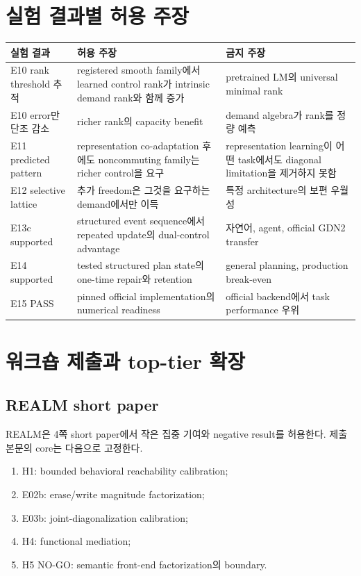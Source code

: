 \documentclass[10.3pt,a4paper]{article}
\begin{document}
\section{실험 결과별 허용 주장}
\begin{longtable}{p{32mm}p{55mm}p{58mm}}
\toprule
실험 결과 & 허용 주장 & 금지 주장 \\
\midrule
E10 rank threshold 추적 & registered smooth family에서 learned control rank가 intrinsic demand rank와 함께 증가 & pretrained LM의 universal minimal rank \\
E10 error만 단조 감소 & richer rank의 capacity benefit & demand algebra가 rank를 정량 예측 \\
E11 predicted pattern & representation co-adaptation 후에도 noncommuting family는 richer control을 요구 & representation learning이 어떤 task에서도 diagonal limitation을 제거하지 못함 \\
E12 selective lattice & 추가 freedom은 그것을 요구하는 demand에서만 이득 & 특정 architecture의 보편 우월성 \\
E13c supported & structured event sequence에서 repeated update의 dual-control advantage & 자연어, agent, official GDN2 transfer \\
E14 supported & tested structured plan state의 one-time repair와 retention & general planning, production break-even \\
E15 PASS & pinned official implementation의 numerical readiness & official backend에서 task performance 우위 \\
\bottomrule
\end{longtable}

\section{워크숍 제출과 top-tier 확장}
\subsection{REALM short paper}
REALM은 4쪽 short paper에서 작은 집중 기여와 negative result를 허용한다\citep{realm2026}. 제출 본문의 core는 다음으로 고정한다.

\begin{enumerate}
\item H1: bounded behavioral reachability calibration;
\item E02b: erase/write magnitude factorization;
\item E03b: joint-diagonalization calibration;
\item H4: functional mediation;
\item H5 NO-GO: semantic front-end factorization의 boundary.
\end{enumerate}
\end{document}
